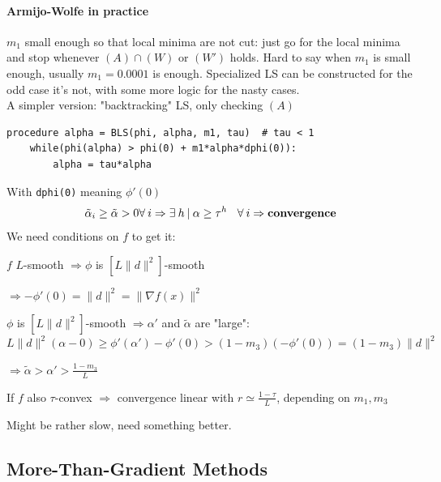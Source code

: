 \documentclass[10pt]{report}
\begin{document}
\paragraph{Armijo-Wolfe in practice} $m_1$ small enough so that local minima are not cut: just go for the local minima and stop whenever $(A)\cap (W)$ or $(W')$ holds. Hard to say when $m_1$ is small enough, usually $m_1 = 0.0001$ is enough. Specialized LS can be constructed for the odd case it's not, with some more logic for the nasty cases.\\
A simpler version: "backtracking" LS, only checking $(A)$
\begin{lstlisting}[style=myPython]
procedure alpha = BLS(phi, alpha, m1, tau)  # tau < 1
	while(phi(alpha) > phi(0) + m1*alpha*dphi(0)):
		alpha = tau*alpha
\end{lstlisting}
With \texttt{dphi(0)} meaning $\phi'(0)$\\
$$\tilde{\alpha}_i \geq \tilde{\alpha} > 0 \forall\:i\Rightarrow\exists\:h\:|\:\alpha\geq\tau^h\:\:\:\:\forall\:i\Rightarrow \text{\textbf{convergence}}$$
We need conditions on $f$ to get it:
\begin{list}{}{}
	\item $f$ $L$-smooth $\Rightarrow \phi$ is $[L\|d\|^2]$-smooth
	\item $\Rightarrow -\phi'(0) = \|d\|^2 = \|\nabla f(x)\|^2$
	\item $\phi$ is $[L\|d\|^2]$-smooth $\Rightarrow \alpha'$ and $\tilde{\alpha}$ are "large":\\
	$L\|d\|^2(\alpha - 0)\geq \phi'(\alpha')-\phi'(0) > (1-m_3)(-\phi'(0)) = (1-m_3)\|d\|^2$
	\item $\Rightarrow \tilde{\alpha} > \alpha' > \frac{1-m_3}{L}$
	\item If $f$ also $\tau$-convex $\Rightarrow$ convergence linear with $r\simeq \frac{1-\tau}{L}$, depending on $m_1,m_3$
\end{list}
Might be rather slow, need something better.
\subsection{More-Than-Gradient Methods}
\end{document}
